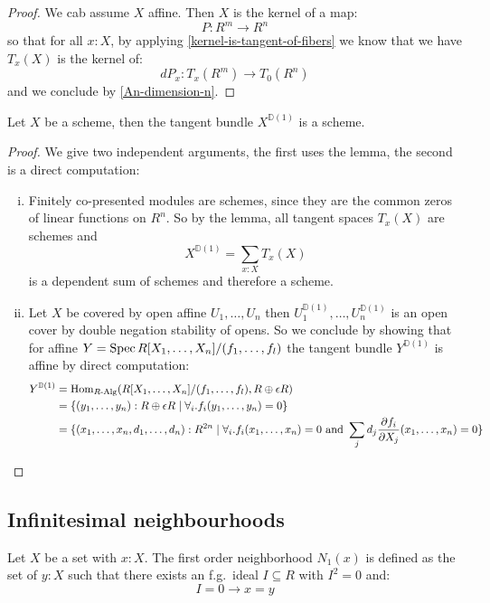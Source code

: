 \begin{proof}
We cab assume $X$ affine. Then $X$ is the kernel of a map:
\[P:R^m\to R^n\]
so that for all $x:X$, by applying \cref{kernel-is-tangent-of-fibers} we know that we have $T_x(X)$ is the kernel of:
\[dP_x : T_x(R^m)\to T_0(R^n)\]
and we conclude by \cref{An-dimension-n}.
\end{proof}

\begin{corollary}
  \label{tangent-bundle-scheme}
  Let $X$ be a scheme, then the tangent bundle $X^{\mathbb{D}(1)}$ is a scheme.
\end{corollary}

\begin{proof}
  We give two independent arguments, the first uses the lemma, the second is a direct computation:
  \begin{enumerate}[(i)]
  \item Finitely co-presented modules are schemes, since they are the common zeros of linear functions on $R^n$.
    So by the lemma, all tangent spaces $T_x(X)$ are schemes and
    \[
      X^{\mathbb{D}(1)}=\sum_{x:X}T_x(X)
    \]
    is a dependent sum of schemes and therefore a scheme.
  \item Let $X$ be covered by open affine $U_1,\dots,U_n$ then $U_1^{\mathbb{D}(1)},\dots,U_n^{\mathbb{D}(1)}$ is an open cover by double negation stability of opens.
    So we conclude by showing that for affine $Y=\operatorname{Spec} R[X_1,\dots,X_n]/(f_1,\dots,f_l)$ the tangent bundle $Y^{\mathbb{D}(1)}$ is affine
    by direct computation:
    \begin{align*}
      Y^{\mathbb{D}(1)}&=\mathrm{Hom}_{R\text{-}\mathrm{Alg}}(R[X_1,\dots,X_n]/(f_1,\dots,f_l), R\oplus \epsilon R) \\
                       &= \{(y_1,\dots,y_n):R\oplus \epsilon R \mid \forall_i. f_i(y_1,\dots,y_n)=0\} \\
                       &= \{(x_1,\dots,x_n,d_1,\dots,d_n):R^{2n} \mid \forall_i. f_i(x_1,\dots,x_n)=0\text{ and } \sum_j d_j\frac{\partial f_i}{\partial X_j}(x_1,\dots,x_n) =0\} 
    \end{align*}
  \end{enumerate}
\end{proof}

\subsection{Infinitesimal neighbourhoods}

\begin{definition}
Let $X$ be a set with $x:X$. The first order neighborhood $N_1(x)$ is defined as the set of $y:X$ such that there exists an f.g.\ ideal $I\subseteq R$ with $I^{2}=0$ and:
\[I=0 \to x=y\]
\end{definition}

